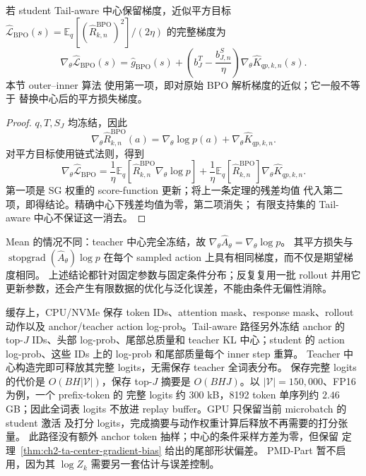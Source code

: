 \documentclass[lang=cn,scheme=chinese,openany]{../book/elegantbook}
\newcommand{\sg}{\operatorname{stopgrad}}
\begin{document}
\begin{proposition}
\label{prop:ch2-ta-square-versus-sg}
若 student Tail-aware 中心保留梯度，近似平方目标 $\widehat{\mathcal L}_{\mathrm{BPO}}(s)=\mathbb E_q[(\widehat R_{k,n}^{\mathrm{BPO}})^2]/(2\eta)$ 的完整梯度为
\begin{equation}
 \nabla_\theta\widehat{\mathcal L}_{\mathrm{BPO}}(s)
 =\widehat g_{\mathrm{BPO}}(s)
 +\left(b_J^T-\frac{b_{J,n}^S}{\eta}\right)
   \nabla_\theta\widehat K_{qp,k,n}(s).
\end{equation}
本节 outer--inner 算法 使用第一项，即对原始 BPO 解析梯度的近似；它一般不等于 替换中心后的平方损失梯度。
\end{proposition}

\begin{proof}
$q,T,S_J$ 均冻结，因此
\begin{equation}
 \nabla_\theta\widehat R_{k,n}^{\mathrm{BPO}}(a)
 =\nabla_\theta\log p(a)+\nabla_\theta\widehat K_{qp,k,n}.
\end{equation}
对平方目标使用链式法则，得到
\begin{equation}
 \nabla_\theta\widehat{\mathcal L}_{\mathrm{BPO}}
 =\frac1\eta\mathbb E_q[\widehat R_{k,n}^{\mathrm{BPO}}\nabla_\theta\log p]
 +\frac1\eta\mathbb E_q[\widehat R_{k,n}^{\mathrm{BPO}}]
   \nabla_\theta\widehat K_{qp,k,n}.
\end{equation}
第一项是 SG 权重的 score-function 更新；将上一条定理的残差均值 代入第二项，即得结论。精确中心下残差均值为零，第二项消失； 有限支持集的 Tail-aware 中心不保证这一消去。
\end{proof}

Mean 的情况不同：teacher 中心完全冻结，故 $\nabla_\theta\widehat A_\theta=\nabla_\theta\log p$。 其平方损失与 $\sg(\widehat A_\theta)\log p$ 在每个 sampled action 上具有相同梯度，而不仅是期望梯度相同。 上述结论都针对固定参数与固定条件分布；反复复用一批 rollout 并用它 更新参数，还会产生有限数据的优化与泛化误差，不能由条件无偏性消除。

缓存上，CPU/NVMe 保存 token IDs、attention mask、response mask、rollout 动作以及 anchor/teacher action log-prob。Tail-aware 路径另外冻结 anchor 的 top-$J$ IDs、头部 log-prob、尾部总质量和 teacher KL 中心；student 的 action log-prob、这些 IDs 上的 log-prob 和尾部质量每个 inner step 重算。 Teacher 中心构造完即可释放其完整 logits，无需保存 teacher 全词表分布。 保存完整 logits 的代价是 $O(BH|\mathcal V|)$，保存 top-$J$ 摘要是 $O(BHJ)$。以 $|\mathcal V|=150{,}000$、FP16 为例，一个 prefix-token 的 完整 logits 约 $300$ kB，8192 token 单序列约 $2.46$ GB；因此全词表 logits 不放进 replay buffer。GPU 只保留当前 microbatch 的 student 激活 及打分 logits，完成摘要与动作权重计算后释放不再需要的打分张量。 此路径没有额外 anchor token 抽样；中心的条件采样方差为零，但保留 定理~\ref{thm:ch2-ta-center-gradient-bias} 给出的尾部形状偏差。 PMD-Part 暂不启用，因为其 $\log Z_k$ 需要另一套估计与误差控制。
\end{document}
